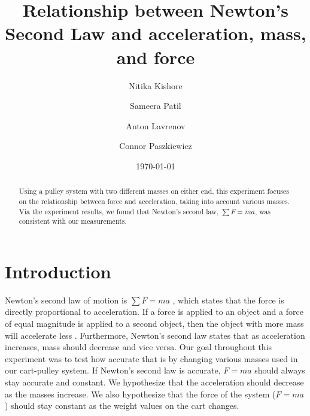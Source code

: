 ﻿\documentclass[reprint,amsmath,amssymb,aps]{revtex4-2}
\begin{document}
\title{Relationship between Newton’s Second Law and acceleration, mass, and force}
\author{Nitika Kishore}
\author{Sameera Patil}
\author{Anton Lavrenov}
\author{Connor Paszkiewicz}
\date{\today}

\begin{abstract}
Using a pulley system with two different masses on either end, this experiment focuses on the relationship between force and acceleration, taking into account various masses. Via the experiment results, we found that Newton’s second law, $\sum F = ma$, was consistent with our measurements. 
\end{abstract}


\maketitle
  
\section{Introduction}
Newton's second law of motion is $\sum F=ma$ \cite{tipler}, which states that the force is directly proportional to acceleration. If a force is applied to an object and a force of equal magnitude is applied to a second object, then the object with more mass will accelerate less \cite{tipler}. Furthermore, Newton’s second law states that as acceleration increases, mass should decrease and vice versa. Our goal throughout this experiment was to test how accurate that is by changing various masses used in our cart-pulley system. If Newton’s second law is accurate, $F=ma$ should always stay accurate and constant. We hypothesize that the acceleration should decrease as the masses increase. We also hypothesize that the force of the system ($F=ma$) should stay constant as the weight values on the cart changes. 
\end{document}
